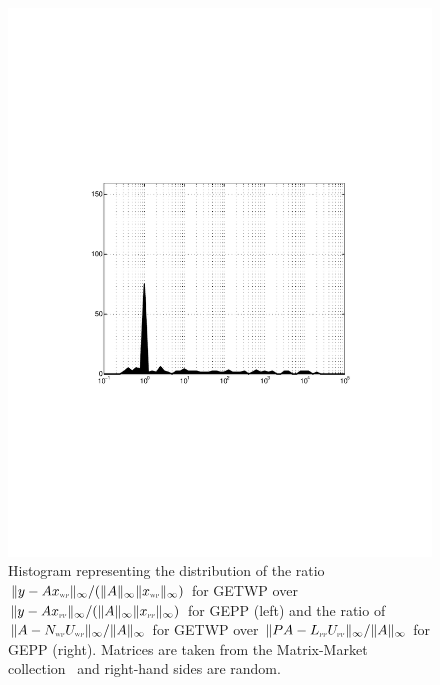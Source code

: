 \documentclass{article}
\begin{document}
\begin{figure}
\begin{minipage}{0.45 \textwidth}
\includegraphics[width=1.00 \textwidth]{images/results_matrixmarket_resLU_003.pdf}
\end{minipage}
\caption{\label{fig:market_res_003}
Histogram representing the distribution of the ratio $\| y - A x_{\textsc{\tiny wp}} \|_\infty/(\| A \|_\infty \|x_{\textsc{\tiny wp}}\|_\infty )$
for GETWP over  $\| y - A x_{\textsc{\tiny pp}} \|_\infty/(\| A \|_\infty \|x_{\textsc{\tiny pp}}\|_\infty )$ for GEPP (left) and the ratio of
$\| A - N_{\textsc{\tiny wp}} U_{\textsc{\tiny wp}} \|_\infty/\| A \|_\infty $ for GETWP over 
$\| PA - L_{\textsc{\tiny pp}} U_{\textsc{\tiny pp}} \|_\infty/\| A \|_\infty $ for GEPP (right).
Matrices are taken from the Matrix-Market collection~\cite{matrixmarket}
and right-hand sides are random.
}
\end{figure}
\end{document}

